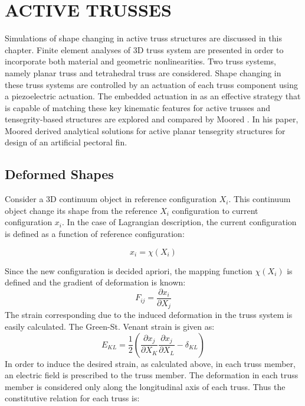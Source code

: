 
\chapter{\uppercase{Active Trusses}}  
\label{section:chap_05_active_trusses} 
Simulations of shape changing in active truss structures are discussed in this chapter.
Finite element analyses of 3D truss system are presented in order to incorporate both material and geometric nonlinearities.
Two truss systems, namely planar truss and tetrahedral truss are considered.
Shape changing in these truss systems are controlled by an actuation of each truss component using a piezoelectric actuation. 
The embedded actuation in as an effective strategy that is capable of matching these key kinematic features for active trusses and tensegrity-based structures are explored and compared by Moored \cite{moored2011analytical}. 
In his paper, Moored \cite{moored2011analytical} derived analytical solutions for active planar tensegrity structures for design of an artificial pectoral fin. 
\\

\section{Deformed Shapes}  
Consider a 3D continuum object in reference configuration $X_i$.
This continuum object change its shape from the reference $X_i$ configuration to current configuration $x_i $.
In the case of Lagrangian description, the current configuration is defined as a function of reference configuration:

\begin{equation}  
x_i=\chi (X_i)   
\label{lagrangian_descriptoin} 
\end{equation}
 
Since the new configuration is decided apriori, the mapping function $\chi (X_i)$ is defined and the gradient of deformation is known:
\begin{equation}
F_{ij}=\frac{\partial x_i}{\partial X_j}
\label{deformation_gradient_tensor}
\end{equation}
The strain corresponding due to the induced deformation in the truss system is easily calculated. 
The Green-St. Venant strain is given as:
\begin{equation}
E_{KL}=\frac{1}{2}\left( \frac{\partial x_j}{\partial X_K}\frac{\partial x_j}{\partial X_L}-\delta_{KL}\right)
\label{lagrange_green_strain}
\end{equation}
In order to induce the desired strain, as calculated above, in each truss member, an electric field is prescribed to the truss member.
The deformation in each truss member is considered only along the longitudinal axis of each truss. 
Thus the constitutive relation for each truss is:

